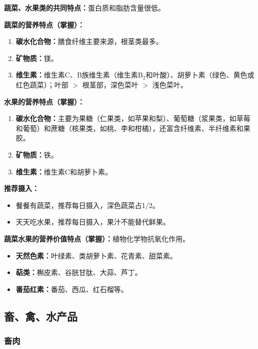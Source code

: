 \begin{keybox}
\textbf{蔬菜、水果类的共同特点：}蛋白质和脂肪含量很低。

\textbf{蔬菜的营养特点（掌握）：}
\begin{enumerate}[leftmargin=*]
    \item \textbf{碳水化合物：}膳食纤维主要来源，根茎类最多。
    \item \textbf{矿物质：}镁。
    \item \textbf{维生素：}维生素C、B族维生素（维生素B$_2$和叶酸）、胡萝卜素（绿色、黄色或红色蔬菜）；叶部 $>$ 根茎部，深色菜叶 $>$ 浅色菜叶。
\end{enumerate}

\textbf{水果的营养特点（掌握）：}
\begin{enumerate}[leftmargin=*]
    \item \textbf{碳水化合物：}主要为果糖（仁果类，如苹果和梨）、葡萄糖（浆果类，如草莓和葡萄）和蔗糖（核果类，如桃、李和柑橘），还富含纤维素、半纤维素和果胶。
    \item \textbf{矿物质：}铁。
    \item \textbf{维生素：}维生素C和胡萝卜素。
\end{enumerate}

\textbf{推荐摄入：}
\begin{itemize}[leftmargin=*]
    \item 餐餐有蔬菜，推荐每日摄入，深色蔬菜占1/2。
    \item 天天吃水果，推荐每日摄入，果汁不能替代鲜果。
\end{itemize}

\textbf{蔬菜水果的营养价值特点（掌握）：}植物化学物抗氧化作用。
\begin{itemize}[leftmargin=*]
    \item \textbf{天然色素：}叶绿素、类胡萝卜素、花青素、甜菜素。
    \item \textbf{萜类：}槲皮素、谷胱甘肽、大蒜、芦丁。
    \item \textbf{番茄红素：}番茄、西瓜、红石榴等。
\end{itemize}
\end{keybox}

\subsection{畜、禽、水产品}

\subsubsection{畜肉}

